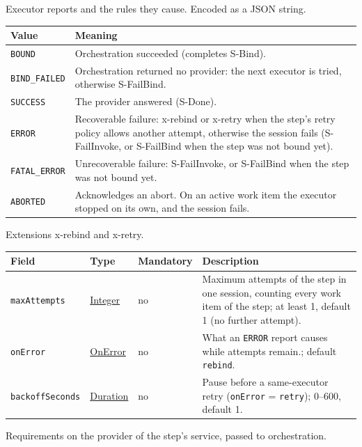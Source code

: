 \documentclass[a4paper]{arrowhead}
\newcommand{\mref}[1]{{\textcolor{ArrowheadPurple}{\hyperref[sec:model:#1]{#1}}}}
\newcommand{\pref}[1]{{\textcolor{ArrowheadGrey}{\hyperref[sec:model:primitives:#1]{#1}}}}
\begin{document}
Executor reports and the rules they cause.
 Encoded as a JSON string.
{\small
\begin{longtable}{|p{3.9cm}|p{11.9cm}|}

\hline
\rowcolor{gray!33} Value & Meaning \\ \hline
\endhead
\texttt{BOUND} & Orchestration succeeded (completes S-Bind). \\ \hline
\texttt{BIND\_FAILED} & Orchestration returned no provider: the next executor is tried, otherwise S-FailBind. \\ \hline
\texttt{SUCCESS} & The provider answered (S-Done). \\ \hline
\texttt{ERROR} & Recoverable failure: x-rebind or x-retry when the step's retry policy allows another attempt, otherwise the session fails (S-FailInvoke, or S-FailBind when the step was not bound yet). \\ \hline
\texttt{FATAL\_ERROR} & Unrecoverable failure: S-FailInvoke, or S-FailBind when the step was not bound yet. \\ \hline
\texttt{ABORTED} & Acknowledges an abort. On an active work item the executor stopped on its own, and the session fails. \\ \hline
\end{longtable}
}

Extensions x-rebind and x-retry.

{\small
\begin{longtable}{|p{3.7cm}|p{4.2cm}|p{1.6cm}|p{6.3cm}|}

\hline
\rowcolor{gray!33} Field & Type & Mandatory & Description \\ \hline
\endhead
\texttt{maxAttempts} & \pref{Integer} & no & Maximum attempts of the step in one session, counting every work item of the step; at least 1, default 1 (no further attempt). \\ \hline
\texttt{onError} & \mref{OnError} & no & What an \texttt{ERROR} report causes while attempts remain.; default \texttt{rebind}. \\ \hline
\texttt{backoff\allowbreak{}Seconds} & \pref{Duration} & no & Pause before a same-executor retry (\texttt{onError} = \texttt{retry}); 0--600, default 1. \\ \hline
\end{longtable}
}

Requirements on the provider of the step's service, passed to orchestration.
\end{document}
